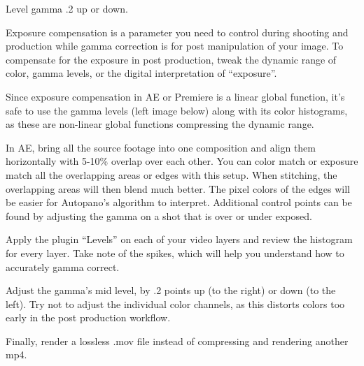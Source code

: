 \begin{fullwidth}
{\large Level gamma .2 up or down. \par}

Exposure compensation is a parameter you need to control during shooting and production while gamma correction is for post manipulation of your image. To compensate for the exposure in post production, tweak the dynamic range of color, gamma levels, or the digital interpretation of “exposure”. 

Since exposure compensation in AE or Premiere is a linear global function, it’s safe to use the gamma levels (left image below) along with its color histograms, as these are non-linear global functions compressing the dynamic range. 


In AE, bring all the source footage into one composition and align them horizontally with 5-10\% overlap over each other. You can color match or exposure match all the overlapping areas or edges with this setup. When stitching, the overlapping areas will then blend much better. The pixel colors of the edges will be easier for Autopano’s algorithm to interpret. Additional control points can be found by adjusting the gamma on a shot that is over or under exposed.


Apply the plugin “Levels” on each of your video layers and review the histogram for every layer. Take note of the spikes, which will help you understand how to accurately gamma correct.


Adjust the gamma’s mid level, by .2 points up (to the right) or down (to the left). Try not to adjust the individual color channels, as this distorts colors too early in the post production workflow.


Finally, render a lossless .mov file instead of compressing and rendering another mp4.


\clearpage
\end{fullwidth}
